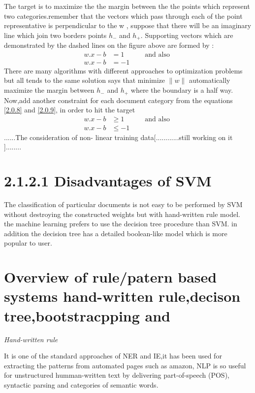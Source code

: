 The target is to maximize the the margin between the the points which represent two categories.remember that the vectors which pass through each of the point representative is perpendicular to the w , suppose that there will be an imaginary line which join two borders points $ h_{-}$ and $ h_{+}$.
Supporting vectors which are demonstrated by the dashed lines on the figure above  are formed by :
\begin{align}
w.x- b & = 1 \label{2.0.8} \quad \quad \quad  \text{and also } \\
w.x- b & = -1 \label{2.0.9}
\end{align}
There are many algorithms with different approaches to optimization problems but all tends to the same solution says that minimize $\parallel w \parallel$ automatically maximize the margin between $ h_{-}$ and $ h_{+}$ where the boundary is a half way.
Now,add another constraint for each document category from the equations \eqref{2.0.8} and \eqref{2.0.9}, in order to hit the target
\begin{align}
w.x- b & \geq     1 \label{2.0.8} \quad \quad \quad  \text{and also } \\
w.x- b & \leq -1 \label{2.0.9}
\end{align}
......The consideration of non- linear training data[............still working on it ]........ 

\section*{2.1.2.1 Disadvantages of SVM} 

The classification of particular documents is not easy to be performed by SVM without destroying the constructed weights  but with hand-written rule model. the machine learning prefers to use the decision tree procedure than SVM. in addition the decision tree has a detailed boolean-like  model which is more popular to user.

\section*{Overview of rule/patern based systems hand-written rule,decison tree,bootstracpping and  }

\textit{Hand-written rule}

It is one of the standard approaches of NER and IE,it has been used for extracting the patterns from automated pages such as amazon, NLP is so useful for unstructured humman-written text by delivering  part-of-speech (POS), syntactic parsing and categories of semantic words.

